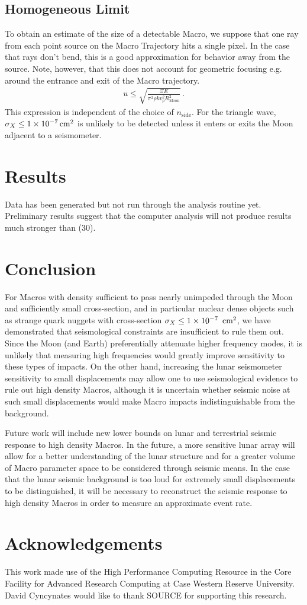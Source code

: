 \documentclass[prd,reprint,10pt]{revtex4-1}
\newcommand*\te[1]{\text{#1}}
\newcommand*\f[2]{\frac{#1}{#2}}
\begin{document}
\subsection{Homogeneous Limit}
To obtain an estimate of the size of a detectable Macro, we suppose that one ray from each point source on the Macro Trajectory hits a single pixel. In the case that rays don't bend, this is a good approximation for behavior away from the source. Note, however, that this does not account for geometric focusing e.g. around the entrance and exit of the Macro trajectory.
\begin{align}
u\leq\sqrt{\f{\Xi E}{\pi^2\rho k v_p^2 R_\te{Moon}^2}}\,.
\end{align}
This expression is independent of the choice of $n_\te{side}$. For the triangle wave, $\sigma_X\leq 1\times 10^{-7}\te{\,cm}^2$ is unlikely to be detected unless it enters or exits the Moon adjacent to a seismometer.
\section{Results}
Data has been generated but not run through the analysis routine yet. Preliminary results suggest that the computer analysis will not produce results much stronger than (30).
\section{Conclusion}
For Macros with density sufficient to pass nearly unimpeded through the Moon and sufficiently small cross-section, and in particular nuclear dense objects such as strange quark nuggets with cross-section $\sigma_X\leq 1\times 10^{-7}\te{\, cm}^2$, we have demonstrated that seismological constraints are insufficient to rule them out. Since the Moon (and Earth) preferentially attenuate higher frequency modes, it is unlikely that measuring high frequencies would greatly improve sensitivity to these types of impacts. On the other hand, increasing the lunar seismometer sensitivity to small displacements may allow one to use seismological evidence to rule out high density Macros, although it is uncertain whether seismic noise at such small displacements would make Macro impacts indistinguishable from the background.

Future work will include new lower bounds on lunar and terrestrial seismic response to high density Macros. In the future, a more sensitive lunar array will allow for a better understanding of the lunar structure and for a greater volume of Macro parameter space to be considered through seismic means. In the case that the lunar seismic background is too loud for extremely small displacements to be distinguished, it will be necessary to reconstruct the seismic response to high density Macros in order to measure an approximate event rate.
\section{Acknowledgements}
This work made use of the High Performance Computing Resource in the Core Facility for Advanced Research Computing at Case Western Reserve University. David Cyncynates would like to thank SOURCE for supporting this research.
{}

\end{document}
